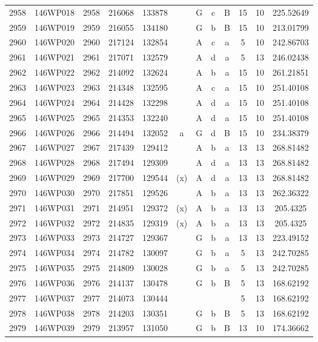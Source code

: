 \begin{tabular}{|*{12}{c|}}
2958 & 146WP018 & 2958 & 216068 & 133878 &  & G & c & B & 15 & 10 & 225.52649 \\ 
2959 & 146WP019 & 2959 & 216055 & 134180 &  & G & b & B & 15 & 10 & 213.01799 \\ 
2960 & 146WP020 & 2960 & 217124 & 132854 &  & A & c & a & 5 & 10 & 242.86703 \\ 
2961 & 146WP021 & 2961 & 217071 & 132579 &  & A & d & a & 5 & 13 & 246.02438 \\ 
2962 & 146WP022 & 2962 & 214092 & 132624 &  & A & b & a & 15 & 10 & 261.21851 \\ 
2963 & 146WP023 & 2963 & 214348 & 132595 &  & A & c & a & 15 & 10 & 251.40108 \\ 
2964 & 146WP024 & 2964 & 214428 & 132298 &  & A & d & a & 15 & 10 & 251.40108 \\ 
2965 & 146WP025 & 2965 & 214353 & 132240 &  & A & d & a & 15 & 10 & 251.40108 \\ 
2966 & 146WP026 & 2966 & 214494 & 132052 & a & G & d & B & 15 & 10 & 234.38379 \\ 
2967 & 146WP027 & 2967 & 217439 & 129412 &  & A & b & a & 13 & 13 & 268.81482 \\ 
2968 & 146WP028 & 2968 & 217494 & 129309 &  & A & d & a & 13 & 13 & 268.81482 \\ 
2969 & 146WP029 & 2969 & 217700 & 129544 & (x) & A & d & a & 13 & 13 & 268.81482 \\ 
2970 & 146WP030 & 2970 & 217851 & 129526 &  & A & b & a & 13 & 13 & 262.36322 \\ 
2971 & 146WP031 & 2971 & 214951 & 129372 & (x) & A & b & a & 13 & 13 & 205.4325 \\ 
2972 & 146WP032 & 2972 & 214835 & 129319 & (x) & A & b & a & 13 & 13 & 205.4325 \\ 
2973 & 146WP033 & 2973 & 214727 & 129367 &  & G & b & a & 13 & 13 & 223.49152 \\ 
2974 & 146WP034 & 2974 & 214782 & 130097 &  & G & b & a & 5 & 13 & 242.70285 \\ 
2975 & 146WP035 & 2975 & 214809 & 130028 &  & G & b & a & 5 & 13 & 242.70285 \\ 
2976 & 146WP036 & 2976 & 214137 & 130478 &  & G & b & B & 5 & 13 & 168.62192 \\ 
2977 & 146WP037 & 2977 & 214073 & 130444 &  &  &  &  & 5 & 13 & 168.62192 \\ 
2978 & 146WP038 & 2978 & 214203 & 130351 &  & G & b & B & 5 & 13 & 168.62192 \\ 
2979 & 146WP039 & 2979 & 213957 & 131050 &  & G & b & B & 13 & 10 & 174.36662 \\ 

\end{tabular}
